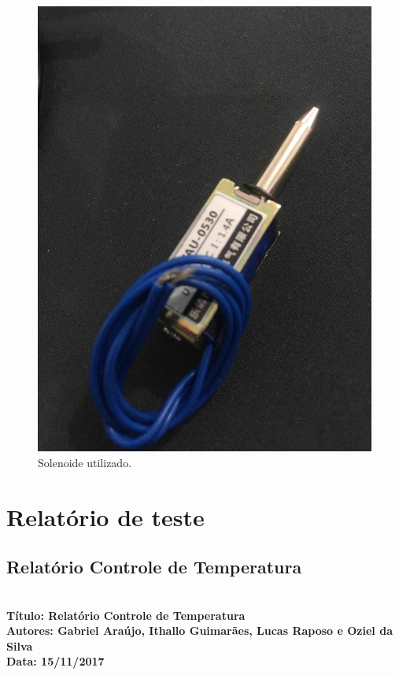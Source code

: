 \begin{figure}[!h]
            \centering
         	\includegraphics[scale= 0.06]{figuras/solenoide.jpg}
            \caption{Solenoide utilizado.}
            \label{solenoide}
\end{figure}

	
\section{Relatório de teste}

\subsection{Relatório Controle de Temperatura}
\textbf{ \\
  Título: Relatório Controle de Temperatura  \\
    Autores: Gabriel Araújo, Ithallo Guimarães, Lucas Raposo e Oziel da Silva\\
      Data: 15/11/2017} \\



